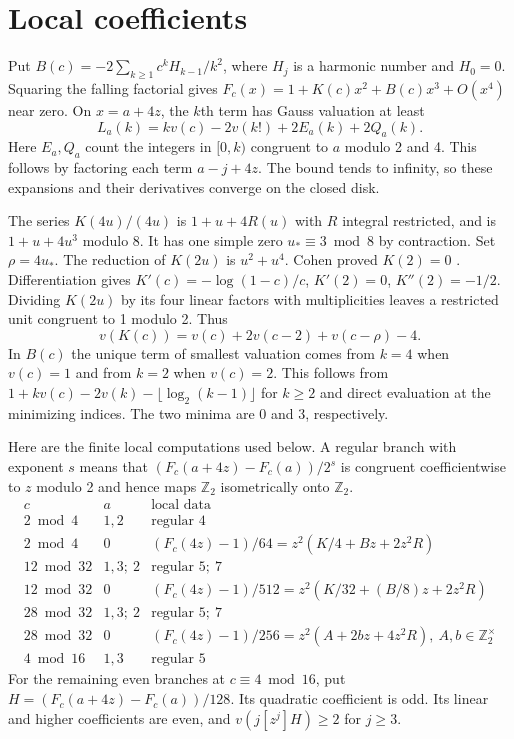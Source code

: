 \documentclass[11pt]{article}
\newcommand{\Z}{\mathbb Z_2}
\newcommand{\U}{\mathbb Z_2^\times}
\begin{document}
\section{Local coefficients}
Put $B(c)=-2\sum_{k\ge1}c^k H_{k-1}/k^2$, where $H_j$ is a harmonic number and $H_0=0$. Squaring the falling factorial gives
$F_c(x)=1+K(c)x^2+B(c)x^3+O(x^4)$ near zero.
On $x=a+4z$, the $k$th term has Gauss valuation at least
\[
 L_a(k)=kv(c)-2v(k!)+2E_a(k)+2Q_a(k).
\]
Here $E_a,Q_a$ count the integers in $[0,k)$ congruent to $a$ modulo 2 and 4. This follows by factoring each term $a-j+4z$. The bound tends to infinity, so these expansions and their derivatives converge on the closed disk.

The series $K(4u)/(4u)$ is $1+u+4R(u)$ with $R$ integral restricted, and is $1+u+4u^3$ modulo 8. It has one simple zero $u_*\equiv3\bmod8$ by contraction. Set $\rho=4u_*$. The reduction of $K(2u)$ is $u^2+u^4$. Cohen proved $K(2)=0$ \cite{cohen}. Differentiation gives $K'(c)=-\log(1-c)/c$, $K'(2)=0$, $K''(2)=-1/2$. Dividing $K(2u)$ by its four linear factors with multiplicities leaves a restricted unit congruent to 1 modulo 2. Thus
\[
 v(K(c))=v(c)+2v(c-2)+v(c-\rho)-4 .
\]
In $B(c)$ the unique term of smallest valuation comes from $k=4$ when $v(c)=1$ and from $k=2$ when $v(c)=2$. This follows from
$1+kv(c)-2v(k)-\lfloor\log_2(k-1)\rfloor$ for $k\ge2$ and direct evaluation at the minimizing indices. The two minima are 0 and 3, respectively.

Here are the finite local computations used below. A regular branch with exponent $s$ means that $(F_c(a+4z)-F_c(a))/2^s$ is congruent coefficientwise to $z$ modulo 2 and hence maps $\Z$ isometrically onto $\Z$.
\[
\begin{array}{c|c|l}
c&a&\text{local data}\\\hline
2\bmod4&1,2&\text{regular }4\\
2\bmod4&0&(F_c(4z)-1)/64=z^2(K/4+Bz+2z^2R)\\
12\bmod32&1,3;\ 2&\text{regular }5;\ 7\\
12\bmod32&0&(F_c(4z)-1)/512=z^2(K/32+(B/8)z+2z^2R)\\
28\bmod32&1,3;\ 2&\text{regular }5;\ 7\\
28\bmod32&0&(F_c(4z)-1)/256=z^2(A+2bz+4z^2R),\ A,b\in\U\\
4\bmod16&1,3&\text{regular }5
\end{array}
\]
For the remaining even branches at $c\equiv4\bmod16$, put $H=(F_c(a+4z)-F_c(a))/128$. Its quadratic coefficient is odd. Its linear and higher coefficients are even, and $v(j[z^j]H)\ge2$ for $j\ge3$.
\end{document}
